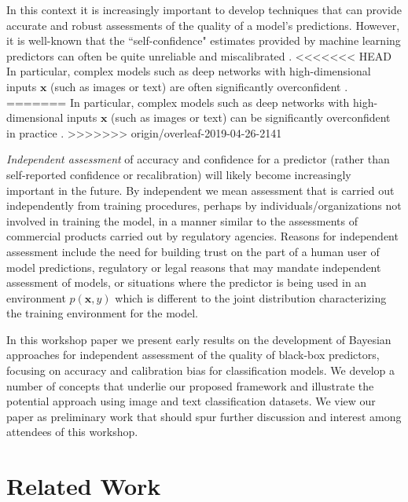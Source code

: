 \documentclass{article}
\newcommand{\ux}{{\mathbf{x}}}
\newcommand{\robby}[1]{\textcolor{Red}{[#1]\textsubscript{Robby}}}
\begin{document}
In this context it is increasingly important to develop techniques that can provide accurate and robust assessments of the quality of a model's predictions.
However, it is well-known that the ``self-confidence" estimates provided by machine learning predictors can often be quite unreliable and miscalibrated \cite{zadrozny2002transforming,kull2017a}.
<<<<<<< HEAD
In particular, complex models such as deep networks with high-dimensional inputs $\ux$ (such as images or text) are often significantly overconfident \cite{gal2016dropout, guo2017calibration,lakshminarayanan2017simple,kuleshov2018accurate, keren2018calibrated}.
=======
In particular, complex models such as deep networks with high-dimensional inputs $\ux$ (such as images or text) can be significantly overconfident in practice \cite{gal2016dropout, guo2017calibration,lakshminarayanan2017simple,kuleshov2018accurate, keren2018calibrated}.  
>>>>>>> origin/overleaf-2019-04-26-2141

{\it Independent assessment} of accuracy and confidence for a predictor (rather than self-reported confidence or recalibration) will likely become increasingly important in the future. By independent we mean assessment that is carried out independently from training procedures, perhaps by individuals/organizations not involved in training the model, in a manner similar to the assessments of commercial products carried out by  regulatory agencies.
Reasons for independent assessment include the need for  building trust on the part of a human user of model predictions,  regulatory or legal reasons that may mandate independent assessment of models, or situations where the predictor is being used in an environment $p(\ux, y)$ which is different to the joint distribution characterizing the training environment for the model.

In this workshop paper we present early results on the development of Bayesian approaches for independent assessment of the quality of black-box predictors, focusing on accuracy and calibration bias for classification models.
We develop a number of concepts that underlie our proposed framework and illustrate the potential approach using image and text classification datasets.
We view our paper as preliminary work that should spur further discussion and interest among attendees of this workshop.


\section{Related Work}
\end{document}
